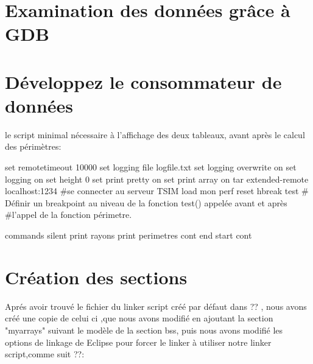 \documentclass[12pt,a4paper]{article}
\begin{document}
\section{Examination des données grâce à GDB}

\section{Développez le consommateur de données}
le script minimal nécessaire à l'affichage des deux tableaux, avant après le calcul des périmètres:

\begin{framed}
 {\selectfont
set remotetimeout 10000\newline
set logging file logfile.txt\newline
set logging overwrite on\newline
set logging on\newline
set height 0 \newline
set print pretty on \newline
set print array on\newline
tar extended-remote localhost:1234 \#se connecter au serveur TSIM\newline 
load\newline
mon perf reset\newline
\color{red}
hbreak test \newline
\color{black}
\# Définir un breakpoint au niveau de la fonction test() appelée avant et après \newline
\#l'appel de la fonction périmetre. \newline

commands \newline
silent \newline
	print rayons\newline
	print perimetres\newline
cont\newline
end\newline
start \newline
cont\newline

}
  \end{framed}   
\newpage
\section{Création des sections}
Aprés avoir trouvé le fichier du linker script créé par défaut dans ?? , nous avons créé une copie de celui ci ,que nous avons modifié en  ajoutant la section "myarrays" suivant le modèle de la section bss, puis nous avons modifié les options de linkage de Eclipse pour forcer le linker à utiliser notre linker script,comme suit ??:
\end{document}
